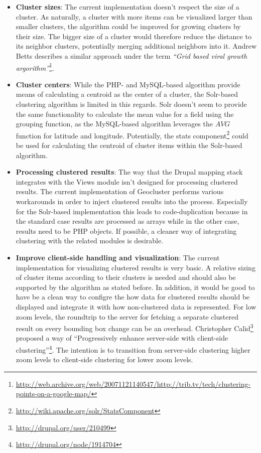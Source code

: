 \begin{itemize}

\item \textbf{Cluster sizes}: The current implementation doesn't respect the size of a cluster. As naturally, a cluster with more items can be visualized larger than smaller clusters, the algorithm could be improved for growing clusters by their size. The bigger size of a cluster would therefore reduce the distance to its neighbor clusters, potentially merging additional neighbors into it. Andrew Betts describes a similar approach under the term \textit{``Grid based viral growth argorithm''}\footnote{\url{http://web.archive.org/web/20071121140547/http://trib.tv/tech/clustering-points-on-a-google-map/}}.

\item \textbf{Cluster centers}: While the PHP- and MySQL-based algorithm provide means of calculating a centroid as the center of a cluster, the Solr-based clustering algorithm is limited in this regards. Solr doesn't seem to provide the same functionality to calculate the mean value for a field using the grouping function, as the MySQL-based algorithm leverages the $AVG$ function for latitude and longitude. Potentially, the stats component\footnote{\url{http://wiki.apache.org/solr/StatsComponent}} could be used for calculating the centroid of cluster items within the Solr-based algorithm.

\item \textbf{Processing clustered results}: The way that the Drupal mapping stack integrates with the Views module isn't designed for processing clustered results. The current implementation of Geocluster performs various workarounds in order to inject clustered results into the process. Especially for the Solr-based implementation this leads to code-duplication because in the standard case results are processed as arrays while in the other case, results need to be PHP objects. If possible, a cleaner way of integrating clustering with the related modules is desirable.   

\item \textbf{Improve client-side handling and visualization}: The current implementation for visualizing clustered results is very basic. A relative sizing of cluster items according to their clusters is needed and should also be supported by the algorithm as stated before. In addition, it would be good to have be a clean way to configre the how data for clustered results should be displayed and integrate it with how non-clustered data is represented. For low zoom levels, the roundtrip to the server for fetching a separate clustered result on every bounding box change can be an overhead. Christopher Calid\footnote{\url{http://drupal.org/user/210499}} proposed a way of ``Progressively enhance server-side with client-side clustering''\footnote{\url{http://drupal.org/node/1914704}}. The intention is to transition from server-side clustering higher zoom levels to client-side clustering for lower zoom levels.

\end{itemize}

